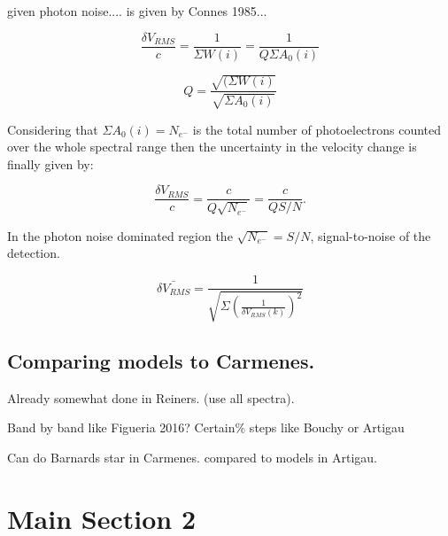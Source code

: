 given photon noise.... is given by Connes 1985... 


\begin{equation}
    \frac{\delta V_{RMS}}{c} = \frac{1}{\Sigma {W(i)}} = \frac{1}{Q \Sigma {A_0(i)}}
\end{equation}

\begin{equation}
Q = \frac{\sqrt{(\Sigma{W(i)}}}{\sqrt{\Sigma{A_0(i)}}}
\end{equation}

Considering that \(\Sigma{A_0(i)} = N_{e^-} \) is the total number of photoelectrons counted over the whole spectral range then the uncertainty in the velocity change is finally given by:

\begin{equation}
\frac{\delta V_{RMS}}{c} = \frac{c}{Q \sqrt{N_{e^-}}} = \frac{c}{Q S/N}.
\end{equation}

In the photon noise dominated region the \(\sqrt{N_{e^-}} = S/N\), signal-to-noise of the detection.  


\begin{equation}
\bar{\delta V_{RMS}} = \frac{1}{\sqrt{\Sigma{(\frac{1}{\delta V_{RMS}(k)})^2}}}
\end{equation}




\subsection{Comparing models to Carmenes.}
Already somewhat done in Reiners. (use all spectra).

Band by band like Figueria 2016?
Certain\% steps like Bouchy or Artigau


Can do Barnards star in Carmenes. compared to models in Artigau.




\section{Main Section 2}
